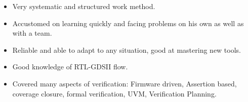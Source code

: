 

\begin{cvparagraph}
  \begin{itemize}
    \item {Very systematic and structured work method.}
    \item {Accustomed on learning quickly and facing problems on his own as well as with a team.}
    \item {Reliable and able to adapt to any situation, good at mastering new tools.}
    \item {Good knowledge of RTL-GDSII flow.}
    \item {Covered many aspects of verification: Firmware driven, Assertion based, coverage closure, formal verification, UVM, Verification Planning.}
  \end{itemize}
\end{cvparagraph}
